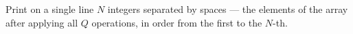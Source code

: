 Print on a single line $N$ integers separated by spaces --- the elements of the array after applying all $Q$ operations, in order from the first to the $N$-th.